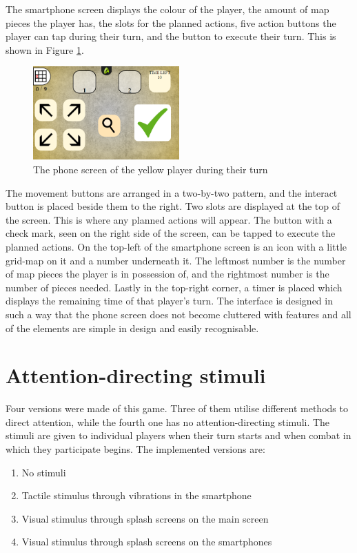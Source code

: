 The smartphone screen displays the colour of the player, the amount of map pieces the player has, the slots for the planned actions, five action buttons the player can tap during their turn, and the button to execute their turn. This is shown in Figure \ref{fig:phone_screen}.

\begin{figure}
	\centering
	\includegraphics[width =0.5\textwidth]{figures/PhoneScreen}
	\caption{The phone screen of the yellow player during their turn}\label{fig:phone_screen}
\end{figure}

The movement buttons are arranged in a two-by-two pattern, and the interact button is placed beside them to the right. Two slots are displayed at the top of the screen. This is where any planned actions will appear. The button with a check mark, seen on the right side of the screen, can be tapped to execute the planned actions. On the top-left of the smartphone screen is an icon with a little grid-map on it and a number underneath it. The leftmost number is the number of map pieces the player is in possession of, and the rightmost number is the number of pieces needed. Lastly in the top-right corner, a timer is placed which displays the remaining time of that player's turn. The interface is designed in such a way that the phone screen does not become cluttered with features and all of the elements are simple in design and easily recognisable.

\section{Attention-directing stimuli}
Four versions were made of this game. Three of them utilise different methods to direct attention, while the fourth one has no attention-directing stimuli. The stimuli are given to individual players when their turn starts and when combat in which they participate begins. The implemented versions are:

\begin{enumerate}[label=\Alph*)]
\item No stimuli
\item Tactile stimulus through vibrations in the smartphone
\item Visual stimulus through splash screens on the main screen
\item Visual stimulus through splash screens on the smartphones
\end{enumerate}


